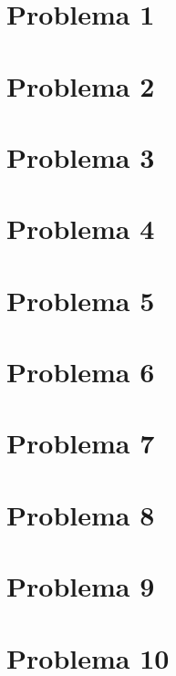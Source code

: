 \documentclass{article}
\begin{document}
	
	\section{Problema 1}
	
	
	\section{Problema 2}
	
	
	\section{Problema 3}
	
	
	\section{Problema 4}
	
	
	\section{Problema 5}
	
	
	\section{Problema 6}
	
	
	\section{Problema 7}
	
	
	\section{Problema 8}
	
	
	\section{Problema 9}
	
	
	\section{Problema 10}
	
	
\end{document}
